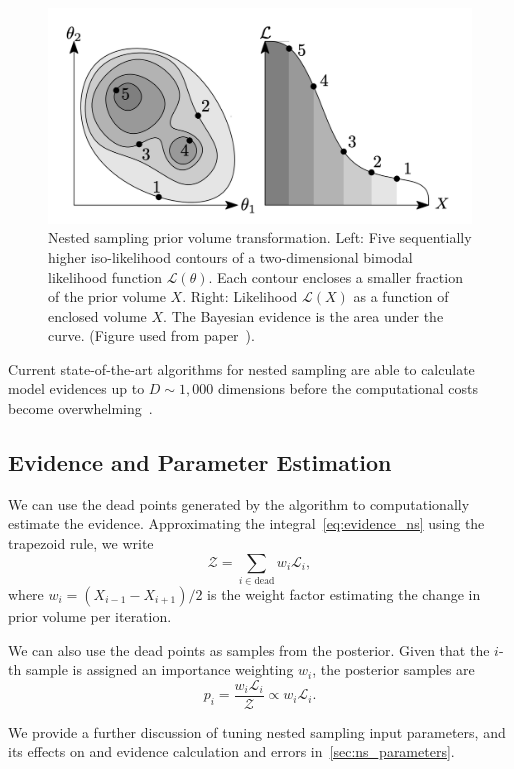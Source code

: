 \documentclass[11pt]{article}
\begin{document}
    \begin{figure}[t!]
        \center
        \includegraphics[width=\linewidth]{../figures/NestedSamplingPolychord}
        \caption{
            Nested sampling prior volume transformation. Left: Five sequentially higher iso-likelihood contours of a
            two-dimensional bimodal likelihood function $\mathcal{L}(\theta)$. Each contour encloses a smaller fraction
            of the prior volume $X$. Right: Likelihood $\mathcal{L}(X)$ as a function of enclosed volume $X$. The
            Bayesian evidence is the area under the curve.
            (Figure used from paper~\cite{Handley_polychord, Handley_2015}).
        }\label{fig:nested_sampling}
    \end{figure}

    Current state-of-the-art algorithms for nested sampling are able to calculate model evidences up to $D \sim 1,000$
    dimensions before the computational costs become overwhelming~\cite{Handley_2015, Feroz_2009, brewer2010diffusive}.

    \subsection{Evidence and Parameter Estimation}\label{subsec:evidence_param_estimation}
    We can use the dead points generated by the algorithm to computationally estimate the evidence.
    Approximating the integral~\eqref{eq:evidence_ns} using the trapezoid rule, we write
    \begin{equation}\label{eq:evidence_estimation}
    \mathcal{Z} = \sum_{i \in \text{dead}} w_i \mathcal{L}_i,
    \end{equation}
    where $w_i = (X_{i-1} - X_{i+1})/2$ is the weight factor estimating the change in prior volume per iteration.

    We can also use the dead points as samples from the posterior.
    Given that the $i$-th sample is assigned an importance weighting $w_i$, the posterior samples are
    \begin{equation}\label{eq:posterior_ns}
    p_i = \frac{w_i \mathcal{L}_i}{\mathcal{Z}} \propto w_i \mathcal{L}_i.
    \end{equation}

    We provide a further discussion of tuning nested sampling input parameters, and its effects on
    and evidence calculation and errors in~\cref{sec:ns_parameters}.
\end{document}
